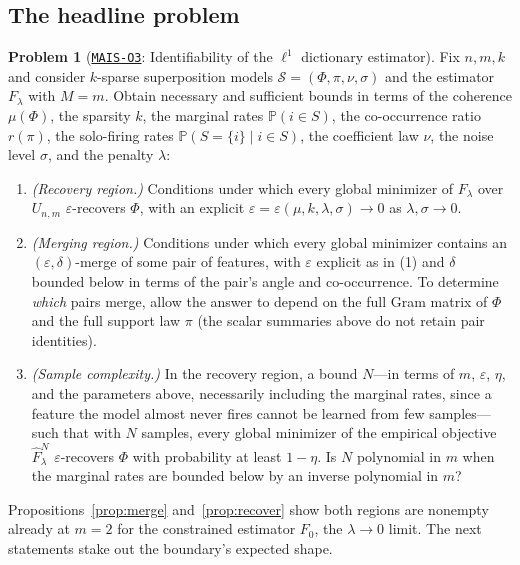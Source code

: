 \documentclass[11pt]{amsart}
\newcommand{\Oid}[1]{\href{https://github.com/lionellevine/MAIS/blob/main/open-problems/MAIS-O#1.md}{\texttt{MAIS-O#1}}}
\theoremstyle{plain}
\theoremstyle{definition}
\newtheorem{problem}[theorem]{Problem}
\newcommand{\pr}{\mathbb{P}}
\begin{document}
\subsection{The headline problem}

\begin{problem}[\Oid{3}: Identifiability of the $\ell^1$ dictionary estimator]\label{prob:main}
Fix $n,m,k$ and consider $k$-sparse superposition models $\mathcal S=(\Phi,\pi,\nu,\sigma)$ and the estimator $F_\lambda$ with $M=m$. Obtain necessary and sufficient bounds in terms of the coherence $\mu(\Phi)$, the sparsity $k$, the marginal rates $\pr(i\in S)$, the co-occurrence ratio $r(\pi)$, the solo-firing rates $\pr(S=\{i\}\mid i\in S)$, the coefficient law $\nu$, the noise level $\sigma$, and the penalty $\lambda$:
\begin{enumerate}
\item \emph{(Recovery region.)} Conditions under which every global minimizer of $F_\lambda$ over $U_{n,m}$ $\varepsilon$-recovers $\Phi$, with an explicit $\varepsilon=\varepsilon(\mu,k,\lambda,\sigma)\to0$ as $\lambda,\sigma\to0$.
\item \emph{(Merging region.)} Conditions under which every global minimizer contains an $(\varepsilon,\delta)$-merge of some pair of features, with $\varepsilon$ explicit as in (1) and $\delta$ bounded below in terms of the pair's angle and co-occurrence. To determine \emph{which} pairs merge, allow the answer to depend on the full Gram matrix of $\Phi$ and the full support law $\pi$ (the scalar summaries above do not retain pair identities).
\item \emph{(Sample complexity.)} In the recovery region, a bound $N$---in terms of $m$, $\varepsilon$, $\eta$, and the parameters above, necessarily including the marginal rates, since a feature the model almost never fires cannot be learned from few samples---such that with $N$ samples, every global minimizer of the empirical objective $\widehat F^N_\lambda$ $\varepsilon$-recovers $\Phi$ with probability at least $1-\eta$. Is $N$ polynomial in $m$ when the marginal rates are bounded below by an inverse polynomial in $m$?
\end{enumerate}
\end{problem}

Propositions~\ref{prop:merge} and~\ref{prop:recover} show both regions are nonempty already at $m=2$ for the constrained estimator $F_0$, the $\lambda\to0$ limit. The next statements stake out the boundary's expected shape.
\end{document}
